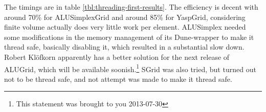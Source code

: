 \documentclass{article}
\newcommand\dune{Dune\xspace}
\begin{document}
The timings are in table \ref{tbl:threading-first-results}.  The efficiency is
decent with around 70\% for ALUSimplexGrid and around 85\% for YaspGrid,
considering finite volume actually does very little work per element.
ALUSimplex needed some modifications in the memory management of its
\dune-wrapper to make it thread safe, basically disabling it, which resulted
in a substantial slow down.  Robert Klöfkorn apparently has a better solution
for the next release of ALUGrid, which will be available
soonish.\footnote{This statement was brought to you 2013-07-30} SGrid was also
tried, but turned out not to be thread safe, and not attempt was made to make
it thread safe.



\end{document}
